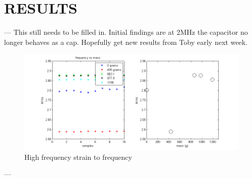 \chapter{RESULTS}
---
This still needs to be filled in.  Initial findings are at 2MHz the capacitor no longer behaves as a cap.  Hopefully get new results from Toby early next week.

\begin{figure}
	\begin{center}
		\includegraphics[width=.8\textwidth]{Images/data_hf.png}
		\caption{High frequency strain to frequency}\label{hf-strain-to-freq}
	\end{center}
\end{figure}
---

